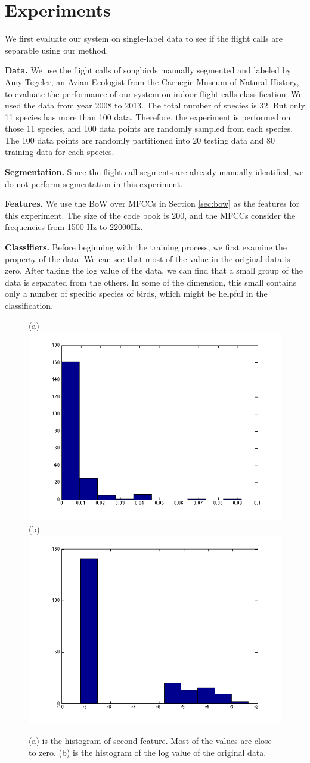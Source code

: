 \documentclass{article} %
\begin{document}
\section{Experiments}

We first evaluate our system on single-label data to see if the flight calls are separable using our method.

\textbf{Data.}  We use the flight calls of songbirds manually segmented and labeled by Amy Tegeler, an Avian Ecologist from the Carnegie Museum of Natural History, to evaluate the performance of our system on indoor flight calls classification. We used the data from year 2008 to 2013. The total number of species is 32. But only 11 species has more than 100 data. Therefore, the experiment is performed on those 11 species, and 100 data points are randomly sampled from each species. The 100 data points are randomly partitioned into 20 testing data and 80 training data for each species.

\textbf{Segmentation.}
Since the flight call segments are already manually identified, we do not perform segmentation in this experiment.

\textbf{Features.}
We use the BoW over MFCCs in Section \ref{sec:bow} as the features for this experiment. The size of the code book is 200, and the MFCCs consider the frequencies from 1500 Hz to 22000Hz.

\textbf{Classifiers.}
Before beginning with the training process, we first examine the property of the data. We can see that most of the value in the original data is zero. After taking the log value of the data, we can find that a small group of the data is separated from the others. In some of the dimension, this small contains only a number of specific species of birds, which might be helpful in the classification.
\begin{figure}[ht!]
    \centering
    {(a)\includegraphics[width=0.45\linewidth]{../Figure/Train_features}
    (b)\includegraphics[width=0.45\linewidth]{../Figure/Train_features_log}}
    \caption{(a) is the histogram of second feature. Most of the values are close to zero. (b) is the histogram of the log value of the original data.}
    \label{fig:hist}
\end{figure}
\end{document}
